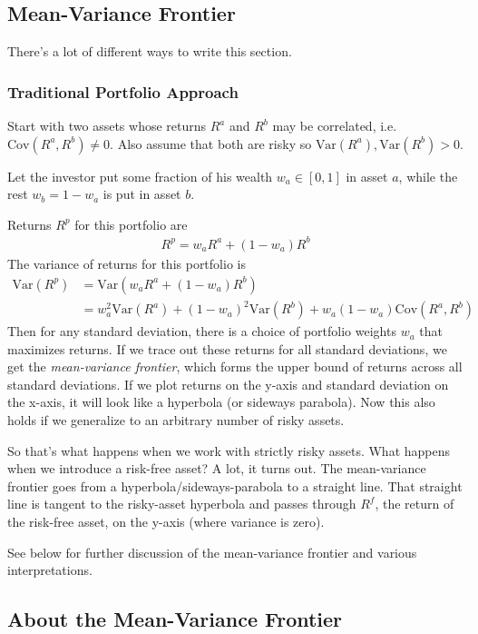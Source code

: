 \documentclass[12pt]{article}
\theoremstyle{plain}
\theoremstyle{definition}
\theoremstyle{remark}
\begin{document}
\subsection{Mean-Variance Frontier}

There's a lot of different ways to write this section.

\subsubsection{Traditional Portfolio Approach}

Start with two assets whose returns $R^a$ and $R^b$ may be correlated,
i.e. $\text{Cov}(R^a,R^b) \neq 0$. Also assume that both are risky so
$\text{Var}(R^a), \text{Var}(R^b)>0$.

Let the investor put some fraction of his wealth $w_a \in [0,1]$ in
asset $a$, while the rest $w_b = 1-w_a$ is put in asset $b$.

Returns $R^p$ for this portfolio are
\begin{align*}
  R^p = w_a R^a + (1-w_a) R^b
\end{align*}
The variance of returns for this portfolio is
\begin{align*}
  \text{Var}(R^p) &= \text{Var}(w_a R^a + (1-w_a)R^b) \\
  &= w_a^2 \text{Var}(R^a) + (1-w_a)^2\text{Var}(R^b)
    + w_a(1-w_a)\text{Cov}(R^a,R^b)
\end{align*}
Then for any standard deviation, there is a choice of portfolio weights
$w_a$ that maximizes returns. If we trace out these returns for all
standard deviations, we get the \emph{mean-variance frontier}, which
forms the upper bound of returns across all standard deviations. If we
plot returns on the y-axis and standard deviation on the x-axis, it will
look like a hyperbola (or sideways parabola).  Now this also holds if we
generalize to an arbitrary number of risky assets.

So that's what happens when we work with strictly risky assets. What
happens when we introduce a risk-free asset? A lot, it turns out. The
mean-variance frontier goes from a hyperbola/sideways-parabola to a
straight line.  That straight line is tangent to the risky-asset
hyperbola and passes through $R^f$, the return of the risk-free asset,
on the y-axis (where variance is zero).

See below for further discussion of the mean-variance frontier and
various interpretations.


\subsection{About the Mean-Variance Frontier}
\end{document}
